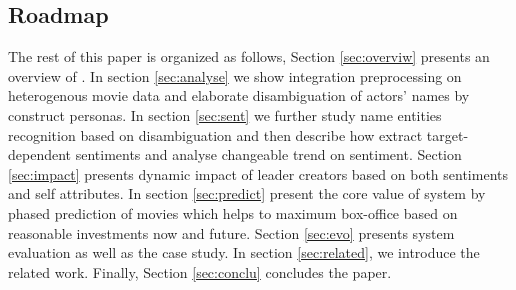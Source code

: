 \subsection{Roadmap}
The rest of this paper is organized as follows, Section \ref{sec:overviw} presents an overview of \system. In section \ref{sec:analyse} we show integration preprocessing on heterogenous movie data and elaborate disambiguation of actors' names by construct personas. In section \ref{sec:sent} we further study name entities recognition based on disambiguation and then describe how \system extract target-dependent sentiments and analyse changeable trend on sentiment. Section \ref{sec:impact} presents dynamic impact of leader creators based on both sentiments and self attributes. In section \ref{sec:predict} present the core value of system by phased prediction of movies which helps to maximum box-office based on reasonable investments now and future. Section \ref{sec:evo} presents system evaluation as well as the case study. In section \ref{sec:related}, we introduce the related work. Finally, Section \ref{sec:conclu} concludes the paper. 